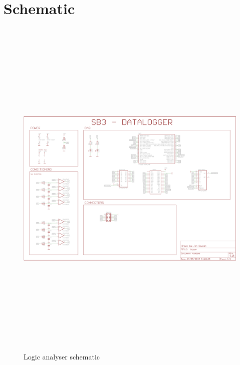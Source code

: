 \documentclass[11pt]{article}
\begin{document}
\appendix
\appendixpage
\addappheadtotoc
\section{Schematic}
\label{app-schematic}
			
    \begin{figure}
    \centering
    \includegraphics[height=17cm,angle=90]{../../hardware/schematic.png}
    \caption{Logic analyser schematic}
    \label{fig:sch}
    \end{figure}
\end{document}
